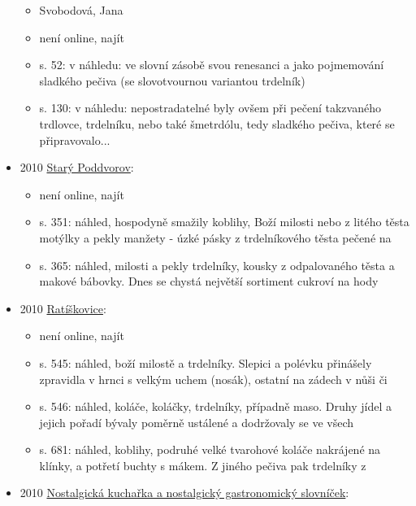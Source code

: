 \begin{itemize}
  \begin{itemize}
  \tightlist
  \item
    Svobodová, Jana
  \item
    není online, najít
  \item
    s. 52: v náhledu: ve slovní zásobě svou renesanci a jako pojmemování
    sladkého pečiva (se slovotvournou variantou trdelník)
  \item
    s. 130: v náhledu: nepostradatelné byly ovšem při pečení takzvaného
    trdlovce, trdelníku, nebo také šmetrdólu, tedy sladkého pečiva,
    které se připravovalo...
  \end{itemize}
\item
  2010
  \href{https://ceskadigitalniknihovna.cz/uuid/uuid:de93a670-fd0d-11e7-b1a1-005056827e52}{Starý
  Poddvorov}:

  \begin{itemize}
  \tightlist
  \item
    není online, najít
  \item
    s. 351: náhled, hospodyně smažily koblihy, Boží milosti nebo z
    litého těsta motýlky a pekly manžety - úzké pásky z trdelníkového
    těsta pečené na
  \item
    s. 365: náhled, milosti a pekly trdelníky, kousky z odpalovaného
    těsta a makové bábovky. Dnes se chystá největší sortiment cukroví na
    hody
  \end{itemize}
\item
  2010
  \href{https://ceskadigitalniknihovna.cz/uuid/uuid:eb53abf0-80d8-11e7-b92d-005056827e51}{Ratíškovice}:

  \begin{itemize}
  \tightlist
  \item
    není online, najít
  \item
    s. 545: náhled, boží milostě a trdelníky. Slepici a polévku
    přinášely zpravidla v hrnci s velkým uchem (nosák), ostatní na
    zádech v nůši či
  \item
    s. 546: náhled, koláče, koláčky, trdelníky, případně maso. Druhy
    jídel a jejich pořadí bývaly poměrně ustálené a dodržovaly se ve
    všech
  \item
    s. 681: náhled, koblihy, podruhé velké tvarohové koláče nakrájené na
    klínky, a potřetí buchty s mákem. Z jiného pečiva pak trdelníky z
  \end{itemize}
\item
  2010
  \href{https://ceskadigitalniknihovna.cz/uuid/uuid:46f5c8f0-d962-11ef-8f57-005056827e51}{Nostalgická
  kuchařka a nostalgický gastronomický slovníček}:


\end{itemize}
